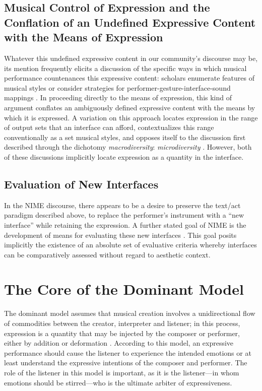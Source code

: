 \subsection{Musical Control of Expression and the Conflation of an Undefined Expressive Content with the Means of Expression}
\label{Gurevich:sub:1_2}
Whatever this undefined expressive content in our community's discourse may be, its mention frequently elicits a discussion of the specific ways in which musical performance countenances this expressive content: scholars enumerate features of musical styles or consider strategies for performer-gesture-interface-sound mappings \cite{Camurri:2004,Paradiso:1997c,Wanderley:1999a}. In proceeding directly to the means of expression, this kind of argument conflates an ambiguously defined expressive content with the means by which it is expressed. A variation on this approach locates expression in the range of output sets that an interface can afford, contextualizes this range conventionally as a set musical styles, and opposes itself to the discussion first described through the dichotomy \textit{macrodiversity}: \textit{microdiversity} \cite{Arfib:2005,Jorda:2005}. However, both of these discussions implicitly locate expression as a quantity in the interface.

\subsection{Evaluation of New Interfaces}
\label{Gurevich:sub:1_3}
In the NIME discourse, there appears to be a desire to preserve the text/act paradigm described above, to replace the performer's instrument with a ``new interface'' while retaining the expression. A further stated goal of NIME is the development of means for evaluating these new interfaces \cite{Poepel:2005}. This goal posits implicitly the existence of an absolute set of evaluative criteria whereby interfaces can be comparatively assessed without regard to aesthetic context.

\section{The Core of the Dominant Model}

The dominant model assumes that musical creation involves a unidirectional flow of commodities between the creator, interpreter and listener; in this process, expression is a quantity that may be injected by the composer or performer, either by addition or deformation \cite{Dobrian:2006,Juslin:2007,Marrin:2000,Poepel:2005}. According to this model, an expressive performance should cause the listener to experience the intended emotions or at least understand the expressive intentions of the composer and performer. The role of the listener in this model is important, as it is the listener---in whom emotions should be stirred---who is the ultimate arbiter of expressiveness.

